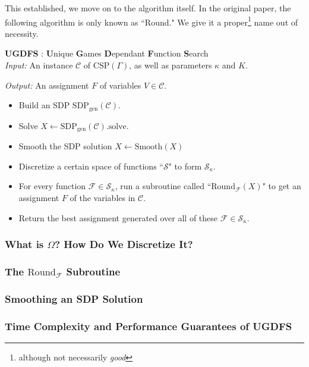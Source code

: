This established, we move on to the algorithm itself. In the original paper, the following algorithm is only known as ``Round." We give it a proper\footnote{although not necessarily \textit{good}} name out of necessity.

\begin{algorithm} \textbf{UGDFS} : \textbf{U}nique \textbf{G}ames \textbf{D}ependant \textbf{F}unction \textbf{S}earch \\

\textit{Input: } An instance $\mathcal{C}$ of $\text{CSP}(\Gamma)$, as well as parameters $\kappa$ and $K$.

\textit{Output: } An assignment $F$ of variables $V \in \mathcal{C}$.
\begin{itemize}
\item Build an SDP $\text{SDP}_{\text{gen}}(\mathcal{C})$.
\item Solve $X \leftarrow \text{SDP}_{\text{gen}}(\mathcal{C}).\text{solve}$.
\item Smooth the SDP solution $X \leftarrow \text{Smooth}(X)$
\item Discretize a certain space of functions ``$\mathcal{S}$" to form $\mathcal{S}_{\kappa}$.
\item For every function $\mathcal{F} \in \mathcal{S}_{\kappa}$, run a subroutine called ``$\text{Round}_{\mathcal{F}}(X)$" to get an assignment $F$ of the variables in $\mathcal{C}$. 
\item Return the best assignment generated over all of these $\mathcal{F} \in \mathcal{S}_{\kappa}$.
\end{itemize}
\end{algorithm}

\subsubsection{What is $\Omega$? How Do We Discretize It?}

\subsubsection{The $\text{Round}_{\mathcal{F}}$ Subroutine}

\subsubsection{Smoothing an SDP Solution}

\subsubsection{Time Complexity and Performance Guarantees of UGDFS}

